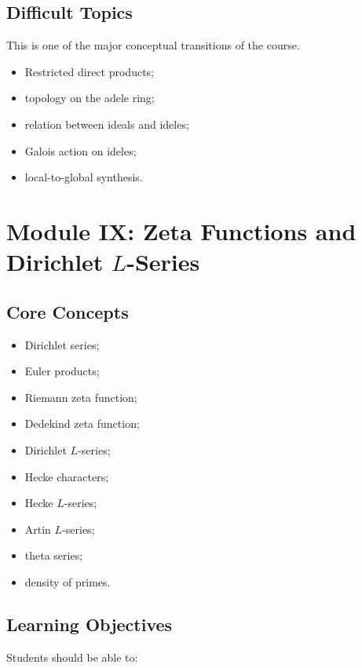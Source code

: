 \documentclass[11pt,a4paper]{article}
\begin{document}
\subsection{Difficult Topics}

This is one of the major conceptual transitions of the course.

\begin{itemize}
    \item Restricted direct products;
    \item topology on the adele ring;
    \item relation between ideals and ideles;
    \item Galois action on ideles;
    \item local-to-global synthesis.
\end{itemize}

\section{Module IX: Zeta Functions and Dirichlet \(L\)-Series}

\subsection{Core Concepts}

\begin{itemize}
    \item Dirichlet series;
    \item Euler products;
    \item Riemann zeta function;
    \item Dedekind zeta function;
    \item Dirichlet \(L\)-series;
    \item Hecke characters;
    \item Hecke \(L\)-series;
    \item Artin \(L\)-series;
    \item theta series;
    \item density of primes.
\end{itemize}

\subsection{Learning Objectives}

Students should be able to:
\end{document}
